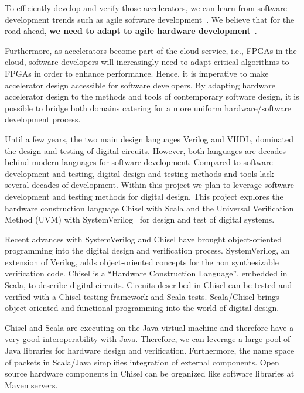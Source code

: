 \documentclass[fleqn,12pt]{article}
\begin{document}
To efficiently develop and verify those accelerators, we can learn from software development trends such as agile software development~\cite{agile:manifesto}.
We believe that for the road ahead, {\bf we need to adapt to agile hardware development}~\cite{henn-patt:turing:2019}.

Furthermore, as accelerators become part of the cloud service, i.e., FPGAs in the cloud,
software developers will increasingly need to adapt critical algorithms to FPGAs in order to enhance performance.
Hence, it is imperative to make accelerator design accessible for software developers.
By adapting hardware accelerator design to the methods and tools of contemporary software design,
it is possible to bridge both domains catering for a more uniform hardware/software development process.

Until a few years, the two main design languages Verilog and VHDL, dominated the
design and testing of digital circuits. However, both languages are decades behind
modern languages for software development.
Compared to software development and testing, digital design and testing methods
and tools lack several decades of development. Within this project we plan to
leverage software development and testing methods for digital design.
This project explores the hardware construction language Chisel with Scala
and the Universal Verification Method (UVM) with SystemVerilog~\cite{SystemVerilog} for
design and test of digital systems.

Recent advances with SystemVerilog and Chisel \cite{chisel:dac2012, chisel:book} have
brought object-oriented programming into the digital design and verification process.
SystemVerilog, an extension of Verilog, adds object-oriented concepts for the non synthesizable verification code.
Chisel is a ``Hardware Construction Language'', embedded in Scala, to describe digital circuits.
Circuits described in Chisel can be tested and verified with a Chisel testing framework and Scala tests.
Scala/Chisel brings object-oriented and functional programming into the world of
digital design.

Chisel and Scala are executing on the Java virtual machine and therefore have a very good
interoperability with Java. Therefore, we can leverage a large pool of Java libraries for
hardware design and  verification.
Furthermore, the name space of packets in Scala/Java simplifies integration of
external components.
Open source hardware components in Chisel can be organized like software
libraries at Maven servers.
\end{document}
